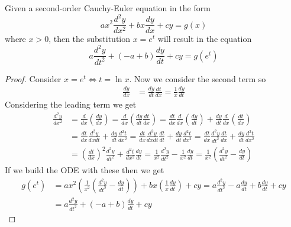 \documentclass[notes]{subfiles}
\begin{document}
\begin{theorem}
    Given a second-order Cauchy-Euler equation in the form
    \[
        ax^2\frac{d^2y}{dx^2} + bx\frac{dy}{dx} + cy = g(x)
    \]
    where $x > 0$, then the substitution $x = e^t$ will result in the equation
    \[
        a\frac{d^2y}{dt^2} + (-a + b)\frac{dy}{dt} + cy = g(e^t)
    \]
\end{theorem}
\begin{proof}
    Consider $x = e^t \iff t = \ln x$.
    Now we consider the second term so
    \begin{align*}
        \frac{dy}{dx}
        &= \frac{dy}{dt}\frac{dt}{dx}
        = \frac{1}{x}\frac{dy}{dt}
    \end{align*}
    Considering the leading term we get
    \begin{align*}
        \frac{d^2y}{dx^2}
        &= \frac{d}{dx}\left( \frac{dy}{dx} \right)
        = \frac{d}{dx}\left(\frac{dy}{dt}\frac{dt}{dx} \right)
        = \frac{dt}{dx}\frac{d}{dx}\left( \frac{dy}{dt} \right) + \frac{dy}{dt}\frac{d}{dx}\left( \frac{dt}{dx} \right) \\
        &= \frac{dt}{dx}\frac{d^2y}{dxdt} + \frac{dy}{dt}\frac{d^2t}{dx^2}
        = \frac{dt}{dx}\frac{d^2y}{dxdt}\frac{dt}{dt} + \frac{dy}{dt}\frac{d^2t}{dx^2}
        = \frac{dt}{dx}\frac{d^2y}{dt^2}\frac{dt}{dx} + \frac{dy}{dt}\frac{d^2t}{dx^2} \\
        &= \left(\frac{dt}{dx}\right)^2\frac{d^2y}{dt^2} + \frac{d^2t}{dx^2}\frac{dy}{dt}
        = \frac{1}{x^2}\frac{d^2y}{dt^2} - \frac{1}{x^2}\frac{dy}{dt}
        = \frac{1}{x^2} \left( \frac{d^2y}{dt^2} - \frac{dy}{dt} \right)
    \end{align*}
    If we build the ODE with these then we get
    \begin{align*}
        g(e^t)
        &= ax^2\left(\frac{1}{x^2}\left( \frac{d^2y}{dt^2} - \frac{dy}{dt} \right)\right) + bx\left(\frac{1}{x}\frac{dy}{dt}\right) + cy
        = a\frac{d^2y}{dt^2} - a\frac{dy}{dt} + b\frac{dy}{dt} + cy \\
        &= a\frac{d^2y}{dt^2} + (-a + b)\frac{dy}{dt} + cy
    \end{align*}
\end{proof}
\end{document}
